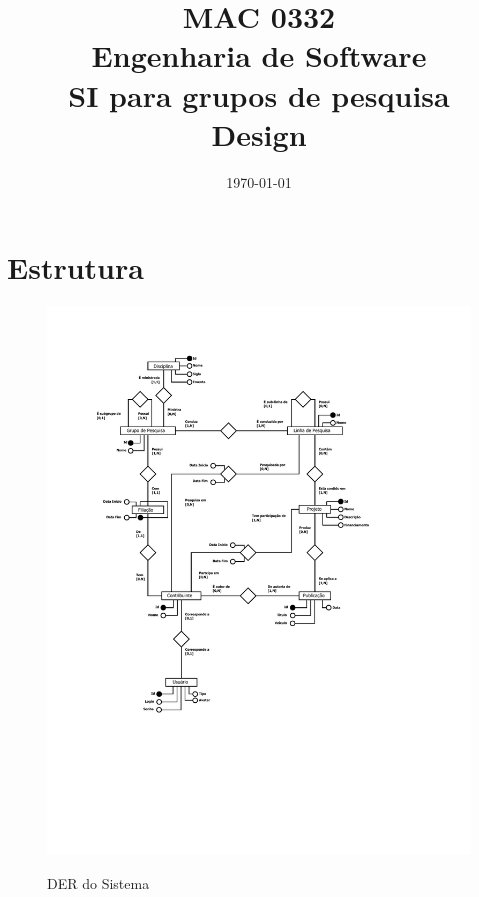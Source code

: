 \documentclass[11pt, a4paper]{article}
\title{MAC 0332\\
	Engenharia de Software\\
	SI para grupos de pesquisa\\
	Design}
\date{\today}
\begin{document}
	\maketitle
	\newpage
	
	\section{Estrutura}
		
		\begin{figure}[h]
            \center
            \includegraphics[width=12cm]{SIGP-DER.pdf}
            \label{DER}
            \caption{DER do Sistema}
        \end{figure}
        \newpage
        
		
\end{document}
